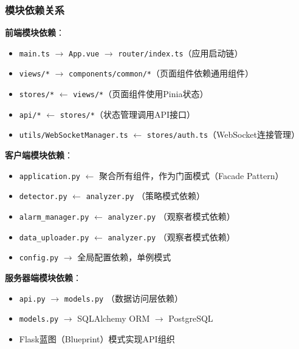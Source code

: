 \documentclass[a4paper,12pt]{article}
\begin{document}
\subsubsection{模块依赖关系}
\textbf{前端模块依赖}：
\begin{itemize}
  \item \texttt{main.ts} $\rightarrow$ \texttt{App.vue} $\rightarrow$ \texttt{router/index.ts}（应用启动链）
  \item \texttt{views/*} $\rightarrow$ \texttt{components/common/*}（页面组件依赖通用组件）
  \item \texttt{stores/*} $\leftarrow$ \texttt{views/*}（页面组件使用Pinia状态）
  \item \texttt{api/*} $\leftarrow$ \texttt{stores/*}（状态管理调用API接口）
  \item \texttt{utils/WebSocketManager.ts} $\leftarrow$ \texttt{stores/auth.ts}（WebSocket连接管理）
\end{itemize}

\textbf{客户端模块依赖}：
\begin{itemize}
  \item \texttt{application.py} $\leftarrow$ 聚合所有组件，作为门面模式（Facade Pattern）
  \item \texttt{detector.py} $\leftarrow$ \texttt{analyzer.py} （策略模式依赖）
  \item \texttt{alarm\_manager.py} $\leftarrow$ \texttt{analyzer.py} （观察者模式依赖）
  \item \texttt{data\_uploader.py} $\leftarrow$ \texttt{analyzer.py} （观察者模式依赖）
  \item \texttt{config.py} $\rightarrow$ 全局配置依赖，单例模式
\end{itemize}

\textbf{服务器端模块依赖}：
\begin{itemize}
  \item \texttt{api.py} $\rightarrow$ \texttt{models.py} （数据访问层依赖）
  \item \texttt{models.py} $\rightarrow$ SQLAlchemy ORM $\rightarrow$ PostgreSQL
  \item Flask蓝图（Blueprint）模式实现API组织
\end{itemize}
\end{document}
